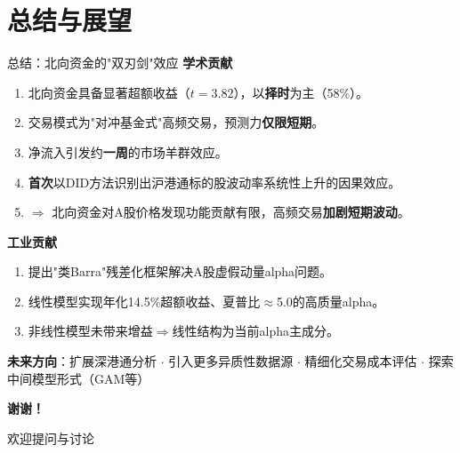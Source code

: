 \documentclass[aspectratio=169, 10pt]{beamer}
\begin{document}
\section{总结与展望}

\begin{frame}{总结：北向资金的"双刃剑"效应}
\textbf{学术贡献}
\begin{enumerate}
    \item 北向资金具备显著超额收益（$t=3.82$），以\textbf{择时}为主（58\%）。
    \item 交易模式为"对冲基金式"高频交易，预测力\textbf{仅限短期}。
    \item 净流入引发约\textbf{一周}的市场羊群效应。
    \item \textbf{首次}以DID方法识别出沪港通标的股波动率系统性上升的因果效应。
    \item $\Rightarrow$ 北向资金对A股价格发现功能贡献有限，高频交易\textbf{加剧短期波动}。
\end{enumerate}

\vspace{0.3em}
\textbf{工业贡献}
\begin{enumerate}
    \item 提出"类Barra"残差化框架解决A股虚假动量alpha问题。
    \item 线性模型实现年化14.5\%超额收益、夏普比$\approx$5.0的高质量alpha。
    \item 非线性模型未带来增益$\Rightarrow$线性结构为当前alpha主成分。
\end{enumerate}

\vspace{0.3em}
\textbf{未来方向}：扩展深港通分析 $\cdot$ 引入更多异质性数据源 $\cdot$ 精细化交易成本评估 $\cdot$ 探索中间模型形式（GAM等）
\end{frame}

\begin{frame}
\centering
\vspace{2cm}
{\Huge\bfseries 谢谢！}

\vspace{1.5cm}
{\large 欢迎提问与讨论}
\end{frame}
\end{document}
